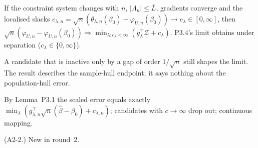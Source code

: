 \begin{result}\label{res:p34prime}
 If the constraint system changes with $n$, $|\Lambda_n|\le\bar L$,
gradients converge and the localised slacks
$c_{\lambda,n}=\sqrt n(\theta_{\lambda,n}(\beta_0)-\varphi_{U,n}(\beta_0))\to c_\lambda\in[0,\infty]$,
then $\sqrt n(\hat\varphi_{U,n}-\varphi_{U,n}(\beta_0))\Rightarrow\min_{\lambda:c_\lambda<\infty}(g_\lambda^\top\mathcal Z+c_\lambda)$.
P3.4's limit obtains under separation ($c_\lambda\in\{0,\infty\}$).
\end{result}
\begin{plain}
A candidate that is inactive only by a gap of order $1/\sqrt n$ still shapes the
limit. The result describes the sample-hull endpoint; it says nothing about the
population-hull error.
\end{plain}
\begin{sketch}
By Lemma~P3.1 the scaled error equals exactly $\min_\lambda(g_{\lambda,n}^\top\sqrt
n(\hat\beta-\beta_0)+c_{\lambda,n})$; candidates with $c\to\infty$ drop out;
continuous mapping.
\end{sketch}
\begin{revnote}(A2-2.) New in round~2.\end{revnote}

